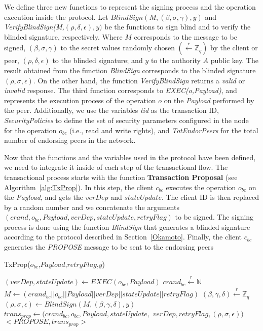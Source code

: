 \documentclass[conference]{llncs}
\begin{document}
We define three new functions to represent the signing process and the operation execution inside the protocol. Let $BlindSign(M,(\beta,\sigma,\gamma),y)$ and \textit{VerifyBlindSign(M,}$(\rho,\delta,\epsilon),y)$ be the functions to sign blind and to verify the blinded signature, respectively. Where $M$ corresponds to the message to be signed, $(\beta,\sigma,\gamma)$ to the secret values randomly chosen $(\xleftarrow[]{r}\mathbb{Z}_q)$ by the client or peer, $(\rho,\delta,\epsilon)$ to the blinded signature; and $y$ to the authority $A$ public key. The result obtained from the function \textit{BlindSign} corresponds to the blinded signature $(\rho,\sigma,\epsilon)$. On the other hand, the function \textit{VerifyBlindSign} returns a \textit{valid} or \textit{invalid} response. The third function corresponds to \textit{EXEC(o,Payload)}, and represents the execution process of the operation $o$ on the \textit{Payload} performed by the peer. Additionally, we use the variables \textit{tid} as the transaction ID, \textit{SecurityPolicies} to define the set of security parameters configured in the node for the operation $o_{bc}$ (i.e., read and write rights), and \textit{TotEndorPeers} for the total number of endorsing peers in the network.

Now that the functions and the variables used in the protocol have been defined, we need to integrate it inside of each step of the transactional flow. The transactional process starts with the function \textbf{Transaction Proposal} (see Algorithm~\ref{alg:TxProp}). In this step, the client $c_{bc}$ executes the operation $o_{bc}$ on the \textit{Payload}, and gets the $verDep$ and $stateUpdate$. The client ID is then replaced by a random number and we concatenate the arguments $(crand,o_{bc},Payload, verDep,stateUpdate,retryFlag)$ to be signed. The signing process is done using the function \textit{BlindSign} that generates a blinded signature according to the protocol described in Section~\ref{Okamoto}. Finally, the client $c_{bc}$ generates the \textit{PROPOSE} message to be sent to the endorsing peers 

\begin{algorithm}[ht]
\caption{TxProp($o_{bc}$,$Payload$,$retryFlag$,$y$)}
\label{alg:TxProp}
\begin{algorithmic}[1]
\STATE $(verDep,stateUpdate) \gets EXEC(o_{{bc}},Payload)$ 
\STATE $crand_{bc}\xleftarrow[]{r}\mathbb{N}$ 
\STATE $M \gets (crand_{bc}||o_{bc}||Payload||verDep||stateUpdate||retryFlag)$
\STATE $(\beta,\gamma,\delta)\xleftarrow[]{r}\mathbb{Z}_q$  
\STATE $(\rho,\sigma,\epsilon) \gets BlindSign(M,(\beta,\gamma,\delta),y)$
\STATE $trans_{prop} \gets (crand_{bc},o_{bc},Payload,stateUpdate,$ $verDep, retryFlag,(\rho,\sigma,\epsilon))$
\RETURN $<\textit{PROPOSE},trans_{prop}>$
\end{algorithmic}
\end{algorithm}
\end{document}
